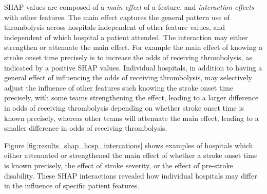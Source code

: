 SHAP values are composed of a \emph{main effect} of a feature, and \emph{interaction effects} with other features. The main effect captures the general pattern use of thrombolysis across hospitals independent of other feature values, and independent of which hospital a patient attended. The interaction may either strengthen or attenuate the main effect. For example the main effect of knowing a stroke onset time precisely is to increase the odds of receiving thrombolysis, as indicated by a positive SHAP values. Individual hospitals, in addition to having a general effect of influencing the odds of receiving thrombolysis, may selectively adjust the influence of other features such knowing the stroke onset time precisely, with some teams strengthening the effect, leading to a larger difference in odds of receiving thrombolysis depending on whether stroke onset time is known precisely, whereas other teams will attenuate the main effect, leading to a smaller difference in odds of receiving thrombolysis.

Figure \ref{fig:results_shap_hosp_intercations} shows examples of hospitals which either attenuated or strengthened the main effect of whether a stroke onset time is known precisely, the effect of stroke severity, or the effect of pre-stroke disability. These SHAP interactions revealed how individual hospitals may differ in the influence of specific patient features.

